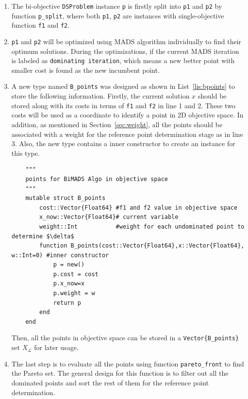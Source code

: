\documentclass[11pt,oneside,onecolumn,openright]{article}
\begin{document}
  \begin{enumerate}
    \item The bi-objective \verb|DSProblem| instance \verb|p| is firstly split into \verb|p1| and \verb|p2| by function \verb|p_split|, where both \verb|p1|, \verb|p2| are instances with single-objective function \verb|f1| and \verb|f2|.
    \item \verb|p1| and \verb|p2| will be optimized using MADS algorithm individually to find their optimum solutions. During the optimizations, if the current MADS iteration is labeled as \verb|dominating iteration|, which means a new better point with smaller cost is found as the new incumbent point. 
    \item A new type named \verb|B_points| was designed as shown in List~\ref{lis:bpoints} to store the following information. Firstly, the current solution $x$ should be stored along with its costs in terms of \verb|f1| and \verb|f2| in line 1 and 2. These two costs will be used as a coordinate to identify a point in 2D objective space. In addition, as mentioned in Section~\ref{sec:weight}, all the points should be associated with a weight for the reference point determination stage as in line 3. Also, the new type contains a inner constructor to create an instance for this type.

    \begin{listing}[ht]
      \begin{verbatim}
    """
    points for BiMADS Algo in objective space
    """
    mutable struct B_points
        cost::Vector{Float64} #f1 and f2 value in objective space
        x_now::Vector{Float64}# current variable
        weight::Int           #weight for each undominated point to determine $\delta$
        function B_points(cost::Vector{Float64},x::Vector{Float64}, w::Int=0) #inner constructor
            p = new()
            p.cost = cost
            p.x_now=x
            p.weight = w
            return p
        end
    end
    \end{verbatim}
  \cprotect\caption{A new type named \verb|B_points|}
  \label{lis:bpoints}
  \end{listing}
      Then, all the points in objective space can be stored in a \verb|Vector{B_points}| set $X_\mathcal{L}$ for later usage.
      \item The last step is to evaluate all the points using function \verb|pareto_front| to find the Pareto set. The general design for this function is to filter out all the dominated points and sort the rest of them for the reference point determination.
  \end{enumerate}
\end{document}

